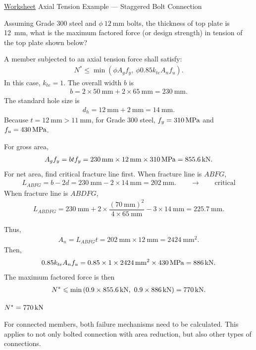\begin{exmp}\href{run:./WORKSHEET/CH03/EX3.ATBC.sm}{Worksheet}
Axial Tension Example --- Staggered Bolt Connection

Assuming Grade 300 steel and $\phi~\SI{12}{\mm}$ bolts, the thickness of top plate is \SI{12}{\mm}, what is the maximum factored force (or design strength) in tension of the top plate shown below?
\begin{figure}[H]

\end{figure}
\end{exmp}
\begin{solution}
A member subjected to an axial tension force shall satisfy:
\begin{gather*}
N^*\leqslant\min\left(\phi{}A_gf_y,~\phi{}0.85k_{te}A_nf_u\right).
\end{gather*}
In this case, $k_{te}=1$. The overall width $b$ is
\begin{gather*}
b=2\times\SI{50}{\mm}+2\times\SI{65}{\mm}=\SI{230}{\mm}.
\end{gather*}
The standard hole size is
\begin{gather*}
d_h=\SI{12}{\mm}+\SI{2}{\mm}=\SI{14}{\mm}.
\end{gather*}
Because $t=\SI{12}{\mm}>\SI{11}{\mm}$, for Grade 300 steel, $f_y=\SI{310}{\mega\pascal}$ and $f_u=\SI{430}{\mega\pascal}$.

For gross area,
\begin{gather*}
A_gf_y=btf_y=\SI{230}{\milli\meter}\times\SI{12}{\milli\meter}\times\SI{310}{\mega\pascal}=\SI{855.6}{\kilo\newton}.
\end{gather*}
For net area, find critical fracture line first. When fracture line is $ABFG$,
\begin{gather*} L_{ABFG}=b-2d=\SI{230}{\mm}-2\times\SI{14}{\mm}=\SI{202}{\mm}.\qquad\rightarrow\qquad\text{critical}
\end{gather*}
When fracture line is $ABDFG$,
\begin{gather*}
L_{ABDFG}=\SI{230}{\mm}+2\times\dfrac{\left(\SI{70}{\mm}\right)^2}{4\times\SI{65}{\mm}}-3\times\SI{14}{\mm}=\SI{225.7}{\mm}.
\end{gather*}
\begin{figure}[H]\centering
\end{figure}
Thus,
\begin{gather*}
A_n=L_{ABFG}t=\SI{202}{\mm}\times\SI{12}{\mm}=\SI{2424}{\mm^2}.
\end{gather*}
Then,
\begin{gather*}
0.85k_{te}A_nf_u=0.85\times1\times\SI{2424}{\milli\meter^2}\times\SI{430}{\mega\pascal}=\SI{886}{\kilo\newton}.
\end{gather*}
The maximum factored force is then
\begin{gather*}
N^*\leqslant\min\left(0.9\times\SI{855.6}{\kilo\newton},~0.9\times\SI{886}{\kilo\newton}\right)=\SI{770}{\kilo\newton}.
\end{gather*}
\begin{flushright}
$N^*=\SI{770}{\kilo\newton}$
\end{flushright}
\end{solution}
For connected members, both failure mechanisms need to be calculated. This applies to not only bolted connection with area reduction, but also other types of connections.

